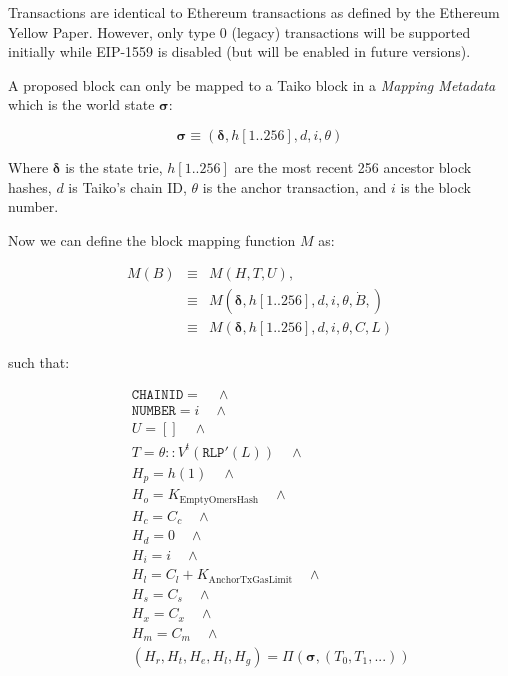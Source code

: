 \documentclass[9pt,oneside]{amsart}
\begin{document}
\begin{multicols}{2}
Transactions are identical to Ethereum transactions as defined by the Ethereum Yellow Paper\cite{yellow-paper}. However, only type 0 (legacy) transactions will be supported initially while EIP-1559 is disabled (but will be enabled in future versions).

A proposed block can only be mapped to a Taiko block in a \emph{Mapping Metadata} which is the world state $\boldsymbol{\sigma}$:

$$\boldsymbol{\sigma} \equiv (\boldsymbol{\delta}, h[1..256], d, i, \theta)$$

Where $\boldsymbol{\delta}$ is the state trie, $h[1..256]$ are the most recent 256 ancestor block hashes, $d$ is Taiko's chain ID, $\theta$ is the anchor transaction, and $i$ is the block number.

Now we can define the block mapping function $M$ as:

\begin{eqnarray}
M(B) & \equiv & M(H, T, U), \\
\nonumber & \equiv &  M(\boldsymbol{\delta}, h[1..256], {d}, i, \theta, \dot{B}, )  \\
\nonumber & \equiv & M(\boldsymbol{\delta}, h[1..256], {d}, i, \theta, C, L)
\end{eqnarray}

such that:

\begin{eqnarray}
& & \texttt{CHAINID}  = \quad \wedge \\
\nonumber& & \texttt{NUMBER} = {i} \quad \wedge \\
\nonumber& & U = [] \quad \wedge \\
\nonumber& & T =  \theta::V^t(\texttt{RLP}'(L)) \quad \wedge  \\
\nonumber& & H_p =  h(1) \quad \wedge \\
\nonumber& & H_o =   K_{\mathrm{EmptyOmersHash}} \quad \wedge \\
\nonumber& & H_c =   C_c \quad \wedge \\
\nonumber& & H_d =   0 \quad \wedge \\
\nonumber& & H_i =   i \quad \wedge \\
\nonumber& & H_l =   C_l + K_{\mathrm{AnchorTxGasLimit}} \quad \wedge \\
\nonumber& & H_s =   C_s \quad \wedge \\
\nonumber& & H_x =   C_x \quad \wedge \\
\nonumber& & H_m =   C_m \quad \wedge \\
\nonumber& & (H_r, H_t, H_e, H_l, H_g) =   \Pi(\boldsymbol{\sigma}, (T_0, T_1, ...))
\end{eqnarray}


\end{multicols}
\end{document}
